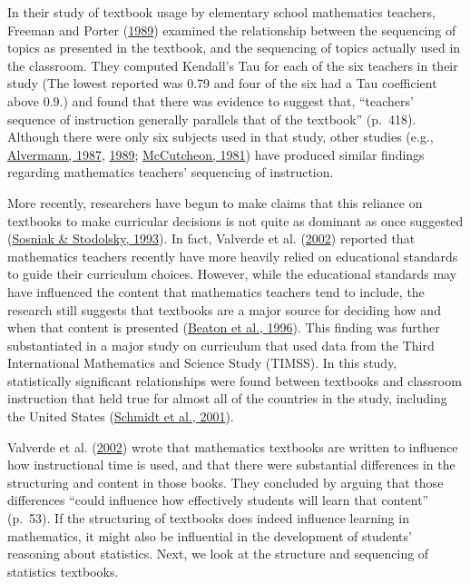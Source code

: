 \documentclass[11pt]{umnthesis}
\begin{document}
In their study of textbook usage by elementary school mathematics teachers, Freeman and Porter (\protect\hyperlink{ref-freeman:1989}{1989}) examined the relationship between the sequencing of topics as presented in the textbook, and the sequencing of topics actually used in the classroom. They computed Kendall's Tau for each of the six teachers in their study (The lowest reported was 0.79 and four of the six had a Tau coefficient above 0.9.) and found that there was evidence to suggest that, ``teachers' sequence of instruction generally parallels that of the textbook'' (p.~418). Although there were only six subjects used in that study, other studies (e.g., \protect\hyperlink{ref-alvermann:1987}{Alvermann, 1987}, \protect\hyperlink{ref-alvermann:1989}{1989}; \protect\hyperlink{ref-mccutcheon:1981}{McCutcheon, 1981}) have produced similar findings regarding mathematics teachers' sequencing of instruction.

More recently, researchers have begun to make claims that this reliance on textbooks to make curricular decisions is not quite as dominant as once suggested (\protect\hyperlink{ref-sosniak:1993}{Sosniak \& Stodolsky, 1993}). In fact, Valverde et al. (\protect\hyperlink{ref-valverde:2002}{2002}) reported that mathematics teachers recently have more heavily relied on educational standards to guide their curriculum choices. However, while the educational standards may have influenced the content that mathematics teachers tend to include, the research still suggests that textbooks are a major source for deciding how and when that content is presented (\protect\hyperlink{ref-beaton:1996}{Beaton et al., 1996}). This finding was further substantiated in a major study on curriculum that used data from the Third International Mathematics and Science Study (TIMSS). In this study, statistically significant relationships were found between textbooks and classroom instruction that held true for almost all of the countries in the study, including the United States (\protect\hyperlink{ref-schmidt:2001}{Schmidt et al., 2001}).

Valverde et al. (\protect\hyperlink{ref-valverde:2002}{2002}) wrote that mathematics textbooks are written to influence how instructional time is used, and that there were substantial differences in the structuring and content in those books. They concluded by arguing that those differences ``could influence how effectively students will learn that content'' (p.~53). If the structuring of textbooks does indeed influence learning in mathematics, it might also be influential in the development of students' reasoning about statistics. Next, we look at the structure and sequencing of statistics textbooks.
\end{document}
